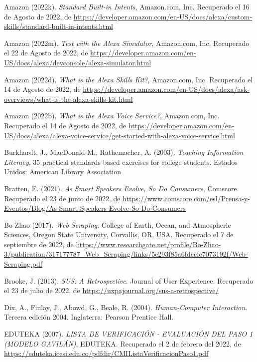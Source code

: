 \begin{thebibliography}{9}
Amazon (2022k). \emph{Standard Built-in Intents}, Amazon.com, Inc. Recuperado el 16 de Agosto de 2022, de \url{https://developer.amazon.com/en-US/docs/alexa/custom-skills/standard-built-in-intents.html}

Amazon (2022m). \emph{Test with the Alexa Simulator}, Amazon.com, Inc. Recuperado el 22 de Agosto de 2022, de \url{https://developer.amazon.com/en-US/docs/alexa/devconsole/alexa-simulator.html}

Amazon (2022d). \emph{What is the Alexa Skills Kit?}, Amazon.com, Inc. Recuperado el 14 de Agosto de 2022, de \url{https://developer.amazon.com/en-US/docs/alexa/ask-overviews/what-is-the-alexa-skills-kit.html}

Amazon (2022b). \emph{What is the Alexa Voice Service?}, Amazon.com, Inc. Recuperado el 14 de Agosto de 2022, de \url{https://developer.amazon.com/en-US/docs/alexa/alexa-voice-service/get-started-with-alexa-voice-service.html}

Burkhardt, J.,  MacDonald M., Rathemacher, A. (2003). \emph{Teaching Information Literacy}, 35 practical standards-based exercises for college students. Estados Unidos: American Library Association

Bratten, E. (2021). \emph{As Smart Speakers Evolve, So Do Consumers}, Comscore. Recuperado el 23 de junio de 2022, de \url{https://www.comscore.com/esl/Prensa-y-Eventos/Blog/As-Smart-Speakers-Evolve-So-Do-Consumers}

Bo Zhao (2017). \emph{Web Scraping}. College of Earth, Ocean, and Atmospheric Sciences, Oregon State University, Corvallis, OR, USA. Recuperado el 7 de septiembre de 2022, de \url{https://www.researchgate.net/profile/Bo-Zhao-3/publication/317177787_Web_Scraping/links/5c293f85a6fdccfc7073192f/Web-Scraping.pdf}

Brooke, J. (2013). \emph{SUS: A Retrospective}. Journal of User Experience. Recuperado el 23 de julio de 2022, de \url{https://uxpajournal.org/sus-a-retrospective/}

Dix, A., Finlay, J., Abowd, G., Beale, R. (2004). \emph{Human-Computer Interaction}. Tercera edición 2004. Inglaterra: Pearson Prentice Hall.

EDUTEKA (2007). \emph{LISTA DE VERIFICACIÓN - EVALUACIÓN DEL PASO 1 (MODELO GAVILÁN)}, EDUTEKA. Recuperado el 2 de febrero del 2022, de \url{https://eduteka.icesi.edu.co/pdfdir/CMIListaVerificacionPaso1.pdf}


\end{thebibliography}
